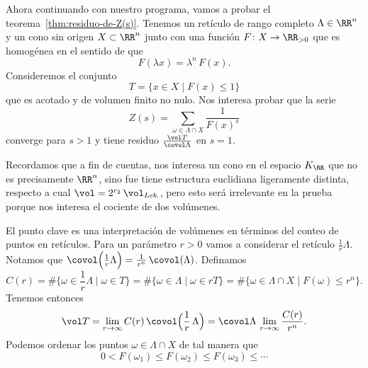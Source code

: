 Ahora continuando con nuestro programa, vamos a probar el
teorema~\ref{thm:residuo-de-Z(s)}. Tenemos un retículo de rango completo
$\Lambda \in \RR^n$ y un cono sin origen $X \subset \RR^n$ junto con una función
$F\colon X\to \RR_{>0}$ que es homogénea en el sentido de que
$$F (\lambda x) = \lambda^n\,F (x).$$
Consideremos el conjunto
$$T = \{ x \in X \mid F (x) \le 1 \}$$
que es acotado y de volumen finito no nulo. Nos interesa probar que la serie
$$Z (s) = \sum_{\omega \in \Lambda \cap X} \frac{1}{F (x)^s}$$
converge para $s > 1$ y tiene residuo $\frac{\vol T}{\covol \Lambda}$ en
$s = 1$.

\vspace{1em}

Recordamos que a fin de cuentas, nos interesa un cono en el espacio $K_\RR$ que
no es precisamente $\RR^n$, sino fue tiene estructura euclidiana ligeramente
distinta, respecto a cual $\vol = 2^{r_2}\,\vol_{Leb.}$, pero esto será
irrelevante en la prueba porque nos interesa el cociente de dos volúmenes.

\vspace{1em}

El punto clave es una interpretación de volúmenes en términos del conteo de
puntos en retículos. Para un parámetro $r > 0$ vamos a considerar el retículo
$\frac{1}{r}\Lambda$. Notamos que
$\covol\Bigl(\frac{1}{r}\Lambda\Bigr) = \frac{1}{r^n}\,\covol (\Lambda)$.
Definamos
\[ C (r) = \# \{ \omega \in \frac{1}{r}\Lambda \mid \omega \in T \}
         = \# \{ \omega \in \Lambda \mid \omega \in rT \}
         = \# \{ \omega \in \Lambda \cap X \mid F (\omega) \le r^n \}. \]
Tenemos entonces
\[ \vol T = \lim_{r\to\infty} C (r) \, \covol \Bigl(\frac{1}{r}\,\Lambda\Bigr)
          = \covol \Lambda \, \lim_{r\to\infty} \frac{C(r)}{r^n}. \]
Podemos ordenar los puntos $\omega \in \Lambda \cap X$ de tal manera que
$$0 < F (\omega_1) \le F (\omega_2) \le F (\omega_3) \le \cdots$$

